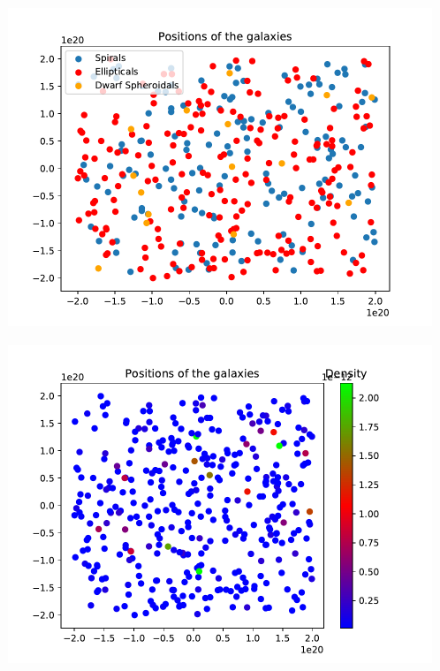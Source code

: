 \documentclass[twocolumn,11pt]{article}
\begin{document}
\begin{figure}[!h]
	\centering
      \includegraphics[width=5.5in]{cluster.pdf}
	\caption{}
	\label{fig:cluster}
\end{figure}

\begin{figure}[!h]
	\centering
      \includegraphics[width=5.5in]{density.pdf}
	\caption{}
	\label{fig:density}
\end{figure}
\end{document}
